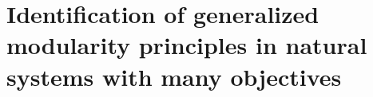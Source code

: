 \chapter{Identification of generalized modularity principles in natural systems with many objectives} \label{ch:many-objectives}
